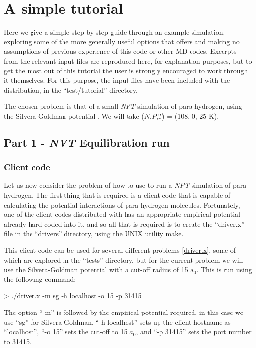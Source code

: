 \documentclass[11pt,english,fleqn]{report}
\newenvironment{code}{%
\footnotesize 
\verbatim
}{
\endverbatim
\normalsize
}
\begin{document}
\section{A simple tutorial}

Here we give a simple step-by-step guide through an example
simulation, exploring
some of the more generally useful options that \ipi offers and making
no assumptions of previous experience of this code or other MD codes.
Excerpts from the relevant input files are reproduced here, for explanation
purposes, but to get the most out of this tutorial the user is strongly encouraged
to work through it themselves. For this purpose, the input files
have been included with the \ipi distribution, in the {}``test/tutorial''
directory.

The chosen problem is that of a small \emph{NPT} simulation of para-hydrogen, 
using the Silvera-Goldman potential \cite{silv-gold78jcp}. 
We will take (\(N\),\(P\),\(T\)) = (108, 0, 25 K).

\subsection{Part 1 - \emph{NVT} Equilibration run}


\subsubsection{Client code}

Let us now consider the problem of how to use \ipi to run a \emph{NPT}
simulation of para-hydrogen. The first thing that is required is a
client code that is capable of calculating the potential interactions
of para-hydrogen molecules. Fortunately, one of the client codes distributed
with \ipi has an appropriate empirical potential already hard-coded
into it, and
so all that is required is to create the {}``driver.x'' file in
the {}``drivers'' directory, using the UNIX utility make.

This client code can be used for several different problems
\ref{driver.x}, some of which
are explored in the {}``tests'' directory, but for the current problem
we will use the Silvera-Goldman potential with a cut-off radius
of 15 \(a_0\). This is run using the following command:

\begin{code}
> ./driver.x -m sg -h localhost -o 15 -p 31415
\end{code}

The option {}``-m'' is followed by the empirical potential required,
in this case we use {}``sg'' for Silvera-Goldman, 
{}``-h localhost'' sets up the client hostname
as {}``localhost'', {}``-o 15'' sets the cut-off to 15 \(a_0\), 
and {}``-p 31415'' sets the port number to 31415. 
\end{document}
